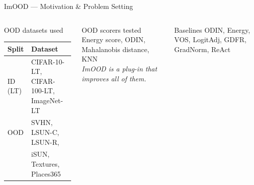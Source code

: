\documentclass[aspectratio=169,10pt]{beamer}
\begin{document}
\begin{frame}{ImOOD --- Motivation \& Problem Setting}
\begin{columns}[T]
      \begin{block}{OOD datasets used}
        \footnotesize
        \begin{tabular}{ll}
          \toprule
          Split & Dataset \\
          \midrule
          ID (LT)  & CIFAR-10-LT, CIFAR-100-LT, ImageNet-LT \\
          OOD      & SVHN, LSUN-C, LSUN-R, \\
                   & iSUN, Textures, Places365 \\
          \bottomrule
        \end{tabular}
      \end{block}
      \vspace{6pt}
      \begin{block}{OOD scorers tested}
        Energy score, ODIN, Mahalanobis distance, KNN\\
        \emph{ImOOD is a plug-in that improves all of them.}
      \end{block}
      \vspace{6pt}
      \begin{block}{Baselines}
        ODIN, Energy, VOS, LogitAdj, GDFR, GradNorm, ReAct
      \end{block}
  \end{columns}
\end{frame}
\end{document}
